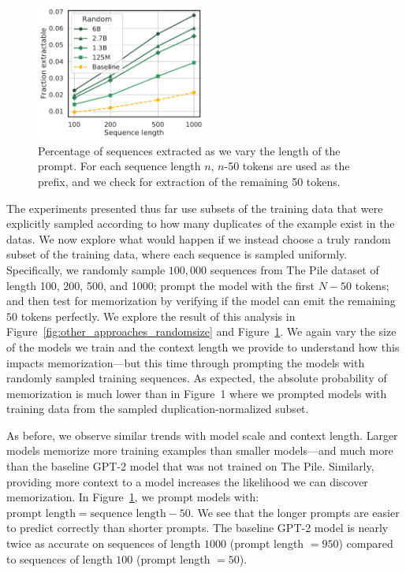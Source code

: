 \begin{figure}[h]
    \centering
    \includegraphics[width=0.5\textwidth]{figures/random_exactly_mem-vs-prompt_len-seq-varyseqlen-gen-50-xlabel-ylabel-markers} %
    \caption{Percentage of sequences extracted as we vary the length of the prompt. For each sequence length $n$, $n$-50 tokens are used as the prefix, and we check for extraction of the remaining 50 tokens.}
    \label{fig:other_approaches_randomlength}
\end{figure}


The experiments presented thus far use subsets of the training data that were explicitly sampled according to how many duplicates of the example exist in the datas.
%
We now explore what would happen if we instead choose a
truly random subset of the training data, where each sequence is sampled uniformly.
%
Specifically, we randomly sample $100,000$ sequences
from The Pile dataset of length 100, 200, 500, and 1000;
prompt the model with the first $N-50$ tokens; and then
test for memorization by verifying if the model can emit the remaining $50$ tokens perfectly.    
%
We explore the result of this analysis in
Figure~\ref{fig:other_approaches_randomsize} and Figure~\ref{fig:other_approaches_randomlength}.
We again vary the size of the models we train and the
context length we provide to understand how this impacts memorization---but this time through prompting the models
with randomly sampled training sequences.
%
As expected, the absolute probability of memorization is much lower than in Figure~1 where we prompted models with training data from the sampled duplication-normalized subset.

As before, we observe similar trends with model scale and context length.
Larger models memorize more training examples than smaller models---and much more than the baseline GPT-2 model
that was not trained on The Pile.
%
Similarly, providing more context to a model increases
the likelihood we can discover memorization.
%
In Figure~\ref{fig:other_approaches_randomlength}, we prompt models with: $\text{prompt length} = \text{sequence length} - 50$. We see that the longer prompts are easier to predict correctly than shorter prompts. 
The baseline GPT-2 model is nearly twice as accurate on
sequences of length $1000$ (prompt length $ = 950$) compared to sequences of length $100$ (prompt length $ = 50$).
%


